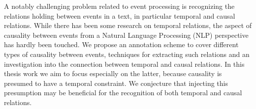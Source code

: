 A notably challenging problem related to event processing is recognizing the relations holding between events in a text, in particular temporal and causal relations. While there has been some research on temporal relations, the aspect of causality between events from a Natural Language Processing (NLP) perspective has hardly been touched. We propose an annotation scheme to cover different types of causality between events, techniques for extracting such relations and an investigation into the connection between temporal and causal relations. In this thesis work we aim to focus especially on the latter, because causality is presumed to have a temporal constraint. We conjecture that injecting this presumption may be beneficial for the recognition of both temporal and causal relations.
